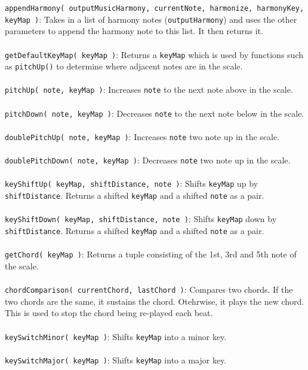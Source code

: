 \begin{singlespace}
\begin{formality}
\texttt{appendHarmony( outputMusicHarmony, currentNote, harmonize, harmonyKey, keyMap )}: Takes in a list of harmony notes (\texttt{outputHarmony}) and uses the other parameters to append the harmony note to this list. It then returns it.\\\\
\texttt{getDefaultKeyMap( keyMap )}: Returns a \texttt{keyMap} which is used by functions such as \texttt{pitchUp()} to determine where adjacent notes are in the scale.\\\\
\texttt{pitchUp( note, keyMap )}: Increases \texttt{note} to the next note above in the scale.\\\\
\texttt{pitchDown( note, keyMap )}: Decreases \texttt{note} to the next note below in the scale.\\\\
\texttt{doublePitchUp( note, keyMap )}: Increases \texttt{note} two note up in the scale.\\\\
\texttt{doublePitchDown( note, keyMap )}: Decreases \texttt{note} two note up in the scale.\\\\
\texttt{keyShiftUp( keyMap, shiftDistance, note )}: Shifts \texttt{keyMap} up by \texttt{shiftDistance}. Returns a shifted \texttt{keyMap} and a shifted \texttt{note} as a pair.\\\\
\texttt{keyShiftDown( keyMap, shiftDistance, note )}: Shifts \texttt{keyMap} down by \texttt{shiftDistance}. Returns a shifted \texttt{keyMap} and a shifted \texttt{note} as a pair.\\\\
\texttt{getChord( keyMap )}: Returns a tuple consisting of the 1st, 3rd and 5th note of the scale.\\\\
\texttt{chordComparison( currentChord, lastChord )}: Compares two chords. If the two chords are the same, it sustains the chord. Otehrwise, it plays the new chord. This is used to stop the chord being re-played each beat.\\\\
\texttt{keySwitchMinor( keyMap )}: Shifts \texttt{keyMap} into a minor key.\\\\
\texttt{keySwitchMajor( keyMap )}: Shifts \texttt{keyMap} into a major key.
\end{formality}
\end{singlespace}

